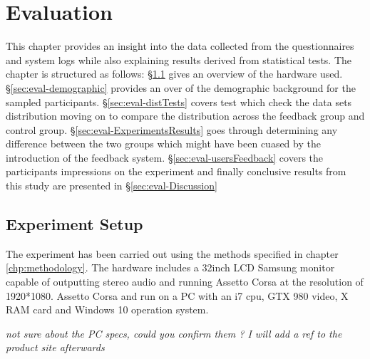 \chapter{Evaluation}
\label{eval}

This chapter provides an insight into the data collected from the questionnaires and \methodname system logs while also explaining results derived from statistical tests. The chapter is structured as follows: \S\ref{sec:eval-experiment} gives an overview of the hardware used. \S\ref{sec:eval-demographic} provides an over of the demographic background for the sampled participants. \S\ref{sec:eval-distTests} covers test which check the data sets distribution moving on to compare the distribution across the feedback group and control group. \S\ref{sec:eval-ExperimentsResults} goes through determining any difference between the two groups which might have been cuased by the introduction of the feedback system. \S\ref{sec:eval-usersFeedback} covers the participants impressions on the experiment and finally conclusive results from this study are presented in \S\ref{sec:eval-Discussion} 

\section{Experiment Setup}
\label{sec:eval-experiment}

The experiment has been carried out using the methods specified in chapter \ref{chp:methodology}. The hardware includes a 32inch LCD Samsung monitor capable of outputting stereo audio and running Assetto Corsa at the resolution of 1920*1080. Assetto Corsa and \methodname run on a PC with an i7 cpu, GTX 980 video, X RAM card and Windows 10 operation system.

\emph{not sure about the PC specs, could you confirm them ? I will add a ref to the product site afterwards}

